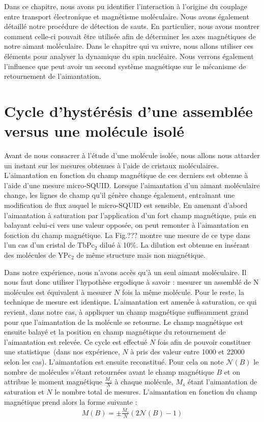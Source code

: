 \vspace{1cm}
Dans ce chapitre, nous avons pu identifier l'interaction à l'origine du couplage entre transport électronique et magnétisme moléculaire. Nous avons également détaillé notre procédure de détection de sauts. En particulier, nous avons montrer comment celle-ci pouvait être utilisée afin de déterminer les axes magnétiques de notre aimant moléculaire. Dans le chapitre qui va suivre, nous allons utiliser ces éléments pour analyser la dynamique du spin nucléaire. Nous verrons également l'influence que peut avoir un second système magnétique sur le mécanisme de retournement de l'aimantation.

\section{Cycle d’hystérésis d'une assemblée versus une molécule isolé}
Avant de nous consacrer à l'étude d'une molécule isolée, nous allons nous attarder un instant sur les mesures obtenues à l'aide de cristaux moléculaires. L'aimantation en fonction du champ magnétique de ces derniers est obtenue à l'aide d'une mesure micro-SQUID. Lorsque l'aimantation d'un aimant moléculaire change, les lignes de champ qu'il génère change également, entraînant une modification de flux auquel le micro-SQUID est sensible. En amenant d'abord l'aimantation à saturation par l'application d'un fort champ magnétique, puis en balayant celui-ci vers une valeur opposée, on peut remonter à l'aimantation en fonction du champ magnétique. La Fig.??? montre une mesure de ce type dans l'un cas d'un cristal de TbPc$_2$ dilué à 10\%. La dilution est obtenue en insérant des molécules de YPc$_2$ de même structure mais non magnétique.

Dans notre expérience, nous n'avons accès qu'à un seul aimant moléculaire. Il nous faut donc utiliser l'hypothèse ergodique à savoir : mesurer un assemblé de N molécules est équivalent à mesurer $N$ fois la même molécule. Pour le reste, la technique de mesure est identique. L'aimantation est amenée à saturation, ce qui revient, dans notre cas, à appliquer un champ magnétique suffisamment grand pour que l'aimantation de la molécule se retourne. Le champ magnétique est ensuite balayé et la position en champ magnétique du retournement de l'aimantation est relevée. Ce cycle est effectué $N$ fois afin de pouvoir constituer une statistique~(dans nos expérience, $N$ à pris des valeur entre 1000 et 22000 selon les cas). L'aimantation est ensuite reconstitué. Pour cela on note $\mathscr{N}(B)$ le nombre de molécules s'étant retournées avant le champ magnétique $B$ et on attribue le moment magnétique $\frac{M_s}{N}$ à chaque molécule, $M_s$ étant l'aimantation de saturation et $N$ le nombre total de mesures. L'aimantation en fonction du champ magnétique prend alors la forme suivante :
\begin{eqnarray}
M(B) =\pm \frac{M_s}{N}(2\mathscr{N}(B) -1)\nonumber
\end{eqnarray}

